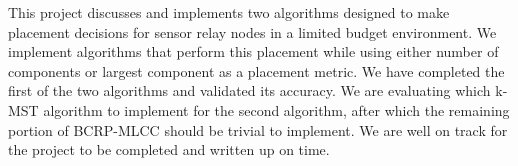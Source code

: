\documentclass{article}
\begin{document}
This project discusses and implements two algorithms designed to make placement decisions for sensor relay nodes in a limited budget environment. We implement algorithms that perform this placement while using either number of components or largest component as a placement metric. We have completed the first of the two algorithms and validated its accuracy. We are evaluating which k-MST algorithm to implement for the second algorithm, after which the remaining portion of BCRP-MLCC should be trivial to implement. We are well on track for the project to be completed and written up on time.






\end{document}
